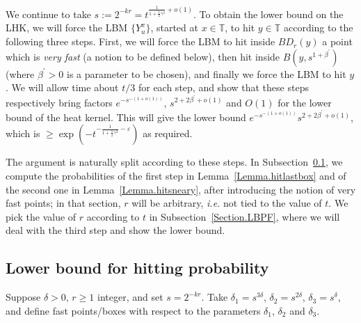 \documentclass[11pt]{article}
\theoremstyle{definition}
\def \b {\beta}
\def \e {\varepsilon}
\def \d {\delta}
\def \T {{\mathbb{T}}}
\begin{document}
We continue to take
$s := 2^{-kr} = t^{\frac 1 {1 + \frac 1 2 \gamma^2}  + o (1)}$. To obtain the
lower bound on the LHK, we will force the LBM
$\{ Y^x_u \}$, started at $x\in \T$, to hit $y\in \T$
according to the following three steps. First, we will force the LBM
to hit inside $BD_r (y)$ a point which is \textit{very fast} (a notion to be defined below), then hit inside $B(y, s^{1 + \b^\prime})$
(where $\b^\prime > 0$ is a parameter to be chosen), and finally we force the LBM to
hit $y$.
We will allow time about $t/3$ for each step,
and show that these steps respectively bring factors
$e^{-s^{- (1+o(1))}}$, $s^{2 + 2 \b^\prime + o(1)}$ and $O(1)$
for the lower bound of the heat kernel. This will give the
lower bound $e^{ - s^{- (1+o(1))} } s^{2 + 2 \b^\prime + o(1)} $,
which is $\ge \exp ( - t^{- \frac 1 { 1 + \frac 1 2 \gamma^2 }  - \e } )$
as required.

The argument is naturally split according to these steps.
In Subsection~\ref{Section.LBHP}, we compute the probabilities of the
first step in Lemma~\ref{Lemma.hitlastbox} and of
the second one in Lemma~\ref{Lemma.hitsneary}, after introducing the notion
of very fast points; in that section, $r$
will be arbitrary, {\em i.e.} not tied to the value of $t$.
We pick the value of $r$ according to $t$ in Subsection~\ref{Section.LBPF},
where we will deal with the third step and show the lower bound.



\subsection{Lower bound for hitting probability} \label{Section.LBHP}

Suppose $\d > 0$, $r \ge 1$ integer, and set
 $s=2^{-kr}$.
 Take $\d_1 = s^{ 3 \delta}$, $\d_2 = s^{2 \delta}$, $\d_3 = s^{\delta}$,
 and define fast points/boxes with respect to the parameters
 $\d_1$, $\d_2$ and $\d_3$.
\end{document}
